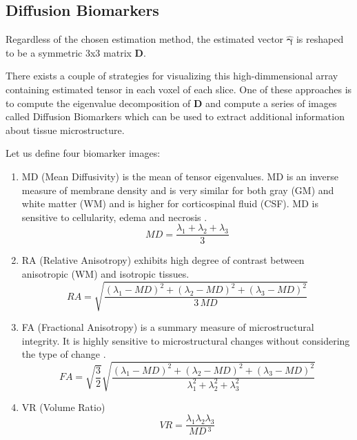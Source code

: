 \hfill
\subsection{Diffusion Biomarkers}

Regardless of the chosen estimation method, the estimated vector $\boldsymbol{\hat{\gamma}}$ is reshaped to be a \vbox{symmetric 3x3 matrix $\boldsymbol{D}$}. 

There exists a couple of strategies for visualizing this high-dimmensional
array containing estimated tensor in each voxel of each slice. One of these approaches is to compute the eigenvalue decomposition of $\boldsymbol{D}$ and
compute a series of images called Diffusion Biomarkers which can be used to extract additional information about tissue microstructure. 

Let us define four biomarker images: 
\begin{enumerate}
	\item MD (Mean Diffusivity) is the mean of tensor eigenvalues. MD is an
	inverse measure of membrane density and is very similar for both gray
	(GM) and white matter (WM) and is higher for corticospinal fluid (CSF).
	MD is sensitive to cellularity, edema and necrosis \cite{m6_basser2002}. 
	\begin{equation}
	MD = \dfrac{\lambda_{1}+\lambda_{2}+\lambda_{3}}{3}
	\label{Eq:m6_eq_23}
	\end{equation}
	
	\item RA (Relative Anisotropy) exhibits high degree of contrast between
	anisotropic (WM) and isotropic tissues. 
	\begin{equation}
	RA = \sqrt{\dfrac{\left(\lambda_{1}-MD\right)^2+\left(\lambda_{2}-MD\right)^2+\left(\lambda_{3}-MD\right)^2}{3\,MD}}
	\label{Eq:m6_eq_24}
	\end{equation}
	
	\item FA (Fractional Anisotropy) is a summary measure of microstructural
	integrity. It is highly sensitive to microstructural changes without
	considering the type of change \cite{m6_soares2013}. 
	\begin{equation}
	FA = \sqrt{\dfrac{3}{2}}\sqrt{\dfrac{\left(\lambda_{1}-MD\right)^2+\left(\lambda_{2}-MD\right)^2+\left(\lambda_{3}-MD\right)^2}{\lambda_{1}^2+\lambda_{2}^2+\lambda_{3}^2}}
	\label{Eq:m6_eq_25}
	\end{equation}
	
	\item VR (Volume Ratio) 
	\begin{equation}
	VR = \frac{\lambda_{1}\lambda_{2}\lambda_{3}}{MD\,^3}
	\label{Eq:m6_eq_26}
	\end{equation}
\end{enumerate}

